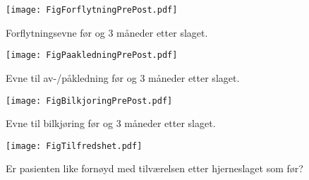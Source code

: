 \documentclass [norsk,a4paper,twoside]{article}\usepackage[]{graphicx}\usepackage[]{color}
\begin{document}
\begin{figure}[ht]
\centering \texttt{[image: FigForflytningPrePost.pdf]}
\caption{\label{fig:ForflytningPrePost} Forflytningsevne før og 3 måneder etter slaget.}
\end{figure}

\begin{figure}[ht]
\centering \texttt{[image: FigPaakledningPrePost.pdf]}
\caption{\label{fig:PaakledningPrePost} Evne til av-/påkledning før og 3 måneder etter slaget.}
\end{figure}


\begin{figure}[ht]
\centering \texttt{[image: FigBilkjoringPrePost.pdf]}
\caption{\label{fig:BilkjoringPrePost} Evne til bilkjøring før og 3 måneder etter slaget.}
\end{figure}


\begin{figure}[ht]
\centering \texttt{[image: FigTilfredshet.pdf]}
\caption{\label{fig:Tilfredshet} Er pasienten like fornøyd med tilværelsen etter 
		hjerneslaget som før?}
\end{figure}

\clearpage
%
\end{document}
